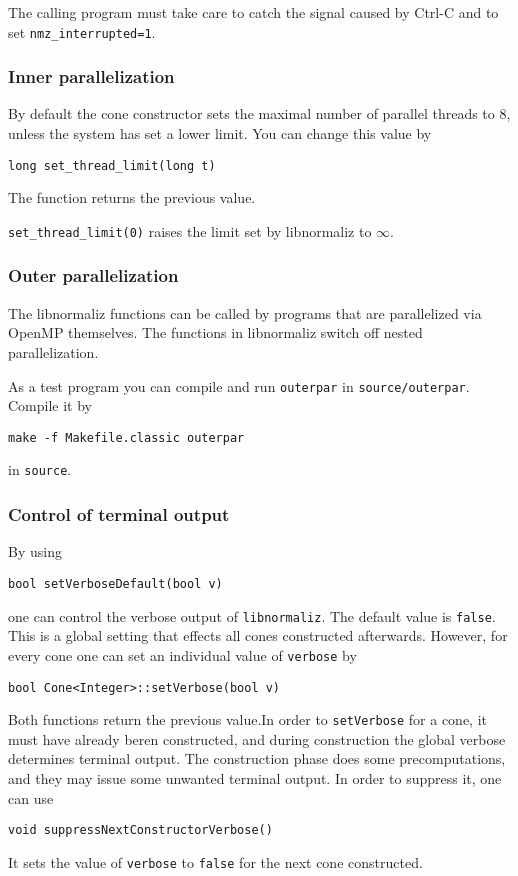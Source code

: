 \begin{small}
The calling program must take care to catch the signal caused by Ctrl-C and to set \verb|nmz_interrupted=1|.

\subsubsection{Inner parallelization}

By default the cone constructor sets the maximal number of parallel threads to $8$, unless the system has set a lower limit. You can change this value by
\begin{Verbatim}
long set_thread_limit(long t)
\end{Verbatim}
The function returns the previous value.

\verb|set_thread_limit(0)| raises the limit set by libnormaliz to $\infty$.

\subsubsection{Outer parallelization}

The libnormaliz functions can be called by programs that are parallelized via OpenMP themselves. The functions in libnormaliz switch off nested parallelization.

As a test program you can compile and run \verb|outerpar| in \verb|source/outerpar|. Compile it by
\begin{Verbatim}
make -f Makefile.classic outerpar
\end{Verbatim}
in \verb|source|.

\subsubsection{Control of terminal output}
By using
\begin{Verbatim}
bool setVerboseDefault(bool v)
\end{Verbatim}
one can control the verbose output of \verb|libnormaliz|. The default value is \verb|false|. This is a global setting that effects all cones constructed afterwards. However, for every cone one can set an individual value of \verb|verbose| by
\begin{Verbatim}
bool Cone<Integer>::setVerbose(bool v)
\end{Verbatim}
Both functions return the previous value.In order to \verb|setVerbose| for a cone, it must have already beren constructed, and during construction the global verbose determines terminal output. The construction phase does some precomputations, and they may issue some unwanted terminal output. In order to suppress it, one can use
\begin{Verbatim}
void suppressNextConstructorVerbose()
\end{Verbatim}
It sets the value of \verb|verbose| to \verb|false| for the next cone constructed. 



\end{small}
